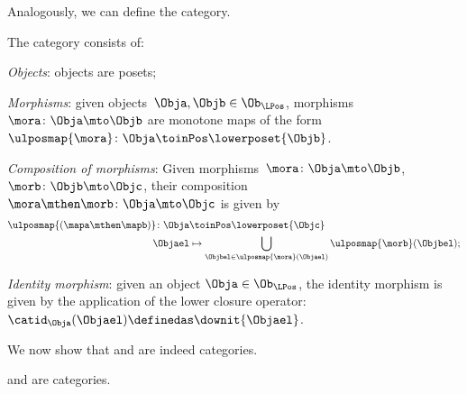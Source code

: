Analogously, we can define the \LPos category.
\begin{definition}
\label{def:lpos_cat}
The category \LPos consists of:
\begin{compactenum}
    \item \emph{Objects}: objects are posets;
    \item \emph{Morphisms}: given objects~$\Obja,\Objb\in \Ob_{\LPos}$, morphisms~$\mora\colon \Obja\mto \Objb$ are monotone maps of the form~$\ulposmap{\mora} \colon \Obja \toinPos \lowerposet{\Objb}$.
    \item \emph{Composition of morphisms}: Given morphisms~$\mora \colon \Obja \mto \Objb$,~$\morb \colon \Objb\mto \Objc$, their composition~$\mora\mthen \morb\colon \Obja\mto \Objc$ is given by
    \begin{equation}
    \begin{aligned}
       \ulposmap{(\mapa \mthen \mapb)} \colon \Obja &\toinPos \lowerposet{\Objc}\\
        \Objael&\mapsto \bigcup_{\Objbel\in \ulposmap{\mora} (\Objael)}\ulposmap{\morb}(\Objbel);
    \end{aligned}
    \end{equation}
    \item \emph{Identity morphism}: given an object $\Obja\in \Ob_{\LPos}$, the identity morphism is given by the application of the lower closure operator:~$\catid_\Obja(\Objael)\definedas \downit\{\Objael\}$.
\end{compactenum}
\end{definition}

We now show that \UPos and \LPos are indeed categories.

\begin{lemma}
\label{lem:upos_lpos_cats}
\UPos and \LPos are categories.
\end{lemma}

